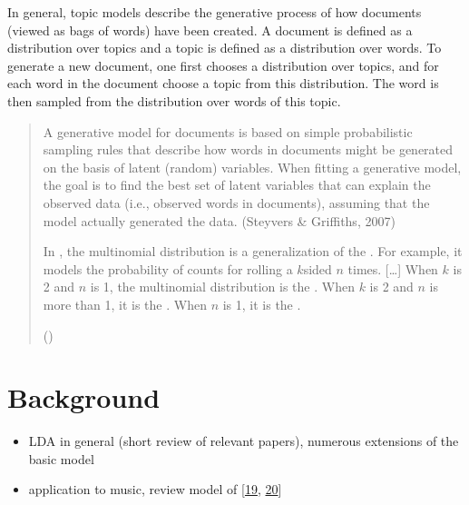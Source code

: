 \documentclass[letterpaper,10pt,english]{sphinxmanual}
\begin{document}
\sphinxAtStartPar
In general, topic models describe the generative process of how
documents (viewed as bags of words) have been created. A document is
defined as a distribution over topics and a topic is defined as a
distribution over words. To generate a new document, one first chooses a
distribution over topics, and for each word in the document choose a
topic from this distribution. The word is then sampled from the
distribution over words of this topic.
\begin{quote}

\sphinxAtStartPar
A generative model for documents is based on simple probabilistic
sampling rules that describe how words in documents might be
generated on the basis of latent (random) variables. When fitting a
generative model, the goal is to find the best set of latent
variables that can explain the observed data (i.e., observed words
in documents), assuming that the model actually generated the data.
(Steyvers \& Griffiths, 2007)

\begin{DUlineblock}{0em}
\item[] In , the
multinomial distribution is a generalization of the .
For example, it models the probability of counts for rolling a
\(k\)\sphinxhyphen{}sided 
\(n\) times. {[}…{]} When \(k\) is 2 and \(n\) is 1, the
multinomial distribution is the .
When \(k\) is 2 and \(n\) is more than 1, it is the
.
When \(n\) is 1, it is the .
\item[] ()
\end{DUlineblock}
\end{quote}


\section{Background}
\label{\detokenize{5_notes:background}}\begin{itemize}
\item {} 
\sphinxAtStartPar
LDA in general (short review of relevant papers), numerous
extensions of the basic model

\item {} 
\sphinxAtStartPar
application to music, review model of
{[}\hyperlink{cite.8_bibliography:id51}{19}, \hyperlink{cite.8_bibliography:id52}{20}{]}

\end{itemize}
\end{document}

